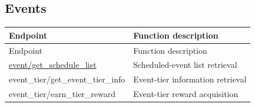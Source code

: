 \subsection{Events}

\begin{longtable}{>{\ttfamily}p{}p{}}
\toprule
Endpoint & Function description \\
\midrule
\endfirsthead%

\toprule
Endpoint & Function description \\
\midrule
\endhead%

\hyperref[subsec:api_event_get_schedule_list]
    {event/get\_schedule\_list}
    & Scheduled-event list retrieval \\

event\_tier/get\_event\_tier\_info
    & Event-tier information retrieval \\

event\_tier/earn\_tier\_reward
    & Event-tier reward acquisition \\

\bottomrule
\end{longtable}